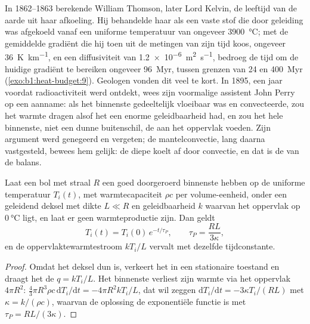 \begin{history}
In 1862--1863 berekende William Thomson, later Lord Kelvin, de leeftijd van de aarde uit haar afkoeling. Hij behandelde haar als een vaste stof die door geleiding was afgekoeld vanaf een uniforme temperatuur van ongeveer \qty{3900}{\degreeCelsius}; met de gemiddelde gradiënt die hij toen uit de metingen van zijn tijd koos, ongeveer \qty{36}{K.km^{-1}}, en een diffusiviteit van \qty{1.2e-6}{m^2.s^{-1}}, bedroeg de tijd om de huidige gradiënt te bereiken ongeveer \qty{96}{Myr}, tussen grenzen van 24 en \qty{400}{Myr} (\cref{exo:b1:heat-budget:9}). Geologen vonden dit veel te kort. In 1895, een jaar voordat radioactiviteit werd ontdekt, wees zijn voormalige assistent John Perry op een aanname: als het binnenste gedeeltelijk vloeibaar was en convecteerde, zou het warmte dragen alsof het een enorme geleidbaarheid had, en zou het hele binnenste, niet een dunne buitenschil, de  aan het oppervlak voeden. Zijn argument werd genegeerd en vergeten; de mantelconvectie, lang daarna vastgesteld, bewees hem gelijk: de diepe  koelt af door convectie, en dat is de  van de balans. %
\end{history}

\begin{proposition}\label{prop:b1:heat-budget:perry}
Laat een bol met straal $R$ een goed doorgeroerd binnenste hebben op de uniforme temperatuur $T_i(t)$, met warmtecapaciteit $\rho c$ per volume-eenheid, onder een geleidend deksel met dikte $L \ll R$ en geleidbaarheid $k$ waarvan het oppervlak op $\qty{0}{\degreeCelsius}$ ligt, en laat er geen warmteproductie zijn. Dan geldt
\[
  T_i(t) = T_i(0)\,e^{-t/\tau_P}, \qquad \tau_P = \frac{RL}{3\kappa},
\]
en de oppervlaktewarmtestroom $kT_i/L$ vervalt met dezelfde tijdconstante.
\end{proposition}

\begin{proof}
Omdat het deksel dun is, verkeert het in een stationaire toestand en draagt het de  $q = kT_i/L$. Het binnenste verliest zijn warmte via het oppervlak $4\pi R^2$:
$\tfrac43\pi R^3\rho c\,\mathrm dT_i/\mathrm dt = -4\pi R^2 kT_i/L$, dat wil zeggen
$\mathrm dT_i/\mathrm dt = -3\kappa T_i/(RL)$ met $\kappa = k/(\rho c)$, waarvan de oplossing de exponentiële functie is met $\tau_P = RL/(3\kappa)$.
\end{proof}

